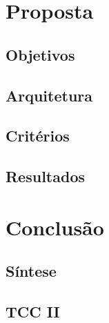 \documentclass{iiufrgs}
\begin{document}
\chapter{Proposta}
\section{Objetivos}
\section{Arquitetura}
\section{Critérios}
\section{Resultados}
\chapter{Conclusão}
\section{Síntese}
\section{TCC II}

\end{document}
